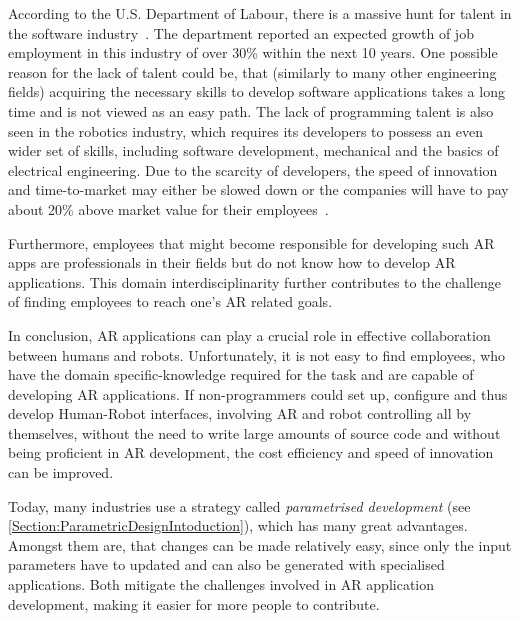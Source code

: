 According to the U.S. Department of Labour, there is a massive hunt for talent in the software industry~\cite{blsGov}. The department reported an expected growth of job employment in this industry of over 30\% within the next 10 years. One possible reason for the lack of talent could be, that (similarly to many other engineering fields) acquiring the necessary skills to develop software applications takes a long time and is not viewed as an easy path. The lack of programming talent is also seen in the robotics industry, which requires its developers to possess an even wider set of skills, including software development, mechanical and the basics of electrical engineering. Due to the scarcity of developers, the speed of innovation and time-to-market may either be slowed down or the companies will have to pay about 20\% above market value for their employees~\cite{devShortageHackernoon}.

Furthermore, employees that might become responsible for developing such AR apps are professionals in their fields but do not know how to develop AR applications. This domain interdisciplinarity further contributes to the challenge of finding employees to reach one's AR related goals. 


\label{Section:PARRHIApproach}

In conclusion, AR applications can play a crucial role in effective collaboration between humans and robots. Unfortunately, it is not easy to find employees, who have the domain specific-knowledge required for the task and are capable of developing AR applications. If non-programmers could set up, configure and thus develop Human-Robot interfaces, involving AR and robot controlling all by themselves, without the need to write large amounts of source code and without being proficient in AR development, the cost efficiency and speed of innovation can be improved.

Today, many industries use a strategy called \textit{parametrised development} (see \ref{Section:ParametricDesignIntoduction}), which has many great advantages. Amongst them are, that changes can be made relatively easy, since only the input parameters have to updated and can also be generated with specialised applications. Both mitigate the challenges involved in AR application development, making it easier for more people to contribute.

